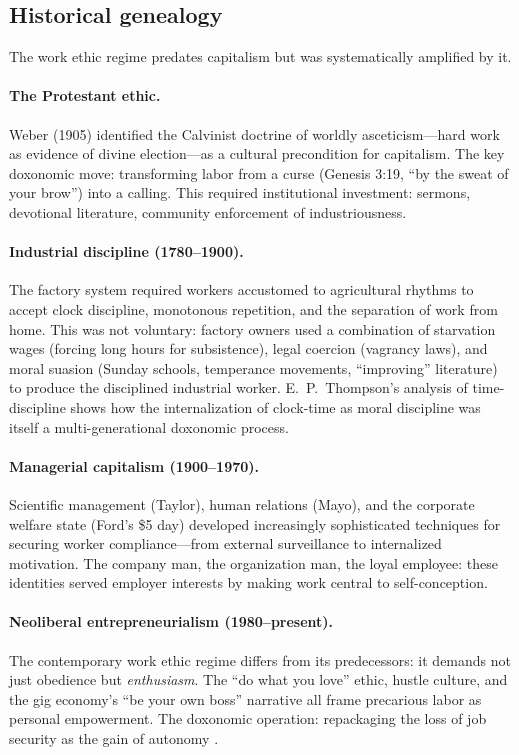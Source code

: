 \subsection{Historical genealogy}

The work ethic regime predates capitalism but was systematically amplified by it.

\paragraph{The Protestant ethic.}
Weber (1905) identified the Calvinist doctrine of worldly asceticism---hard work as evidence of divine election---as a cultural precondition for capitalism.
The key doxonomic move: transforming labor from a curse (Genesis 3:19, ``by the sweat of your brow'') into a calling.
This required institutional investment: sermons, devotional literature, community enforcement of industriousness.

\paragraph{Industrial discipline (1780--1900).}
The factory system required workers accustomed to agricultural rhythms to accept clock discipline, monotonous repetition, and the separation of work from home.
This was not voluntary: factory owners used a combination of starvation wages (forcing long hours for subsistence), legal coercion (vagrancy laws), and moral suasion (Sunday schools, temperance movements, ``improving'' literature) to produce the disciplined industrial worker.
E.\ P.\ Thompson's analysis of time-discipline shows how the internalization of clock-time as moral discipline was itself a multi-generational doxonomic process.

\paragraph{Managerial capitalism (1900--1970).}
Scientific management (Taylor), human relations (Mayo), and the corporate welfare state (Ford's \$5 day) developed increasingly sophisticated techniques for securing worker compliance---from external surveillance to internalized motivation.
The company man, the organization man, the loyal employee: these identities served employer interests by making work central to self-conception.

\paragraph{Neoliberal entrepreneurialism (1980--present).}
The contemporary work ethic regime differs from its predecessors: it demands not just obedience but \emph{enthusiasm}.
The ``do what you love'' ethic, hustle culture, and the gig economy's ``be your own boss'' narrative all frame precarious labor as personal empowerment.
The doxonomic operation: repackaging the loss of job security as the gain of autonomy \autocite{sennett1998}.

